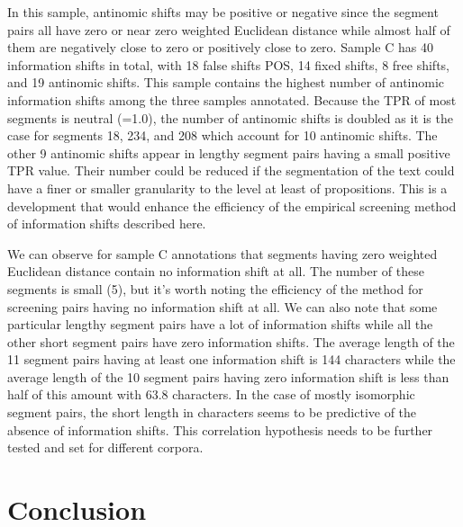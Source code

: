 \documentclass[output=paper]{langsci/langscibook}
\begin{document}
In this sample, antinomic shifts may be positive or negative since the segment pairs all have zero or near zero weighted Euclidean distance while almost half of them are negatively close to zero or positively close to zero. Sample C has 40 information shifts in total, with 18 false shifts POS, 14 fixed shifts, 8 free shifts, and 19 antinomic shifts. This sample contains the highest number of antinomic information shifts among the three samples annotated. Because the TPR of most segments is neutral (=1.0), the number of antinomic shifts is doubled as it is the case for segments 18, 234, and 208 which account for 10 antinomic shifts. The other 9 antinomic shifts appear in lengthy segment pairs having a small positive TPR value. Their number could be reduced if the segmentation of the text could have a finer or smaller granularity to the level at least of propositions. This is a development that would enhance the efficiency of the empirical screening method of information shifts described here. 

We can observe for sample C annotations that segments having zero weighted Euclidean distance contain no information shift at all. The number of these segments is small (5), but it’s worth noting the efficiency of the method for screening pairs having no information shift at all. We can also note that some particular lengthy segment pairs have a lot of information shifts while all the other short segment pairs have zero information shifts. The average length of the 11 segment pairs having at least one information shift is 144 characters while the average length of the 10 segment pairs having zero information shift is less than half of this amount with 63.8 characters. In the case of mostly isomorphic segment pairs, the short length in characters seems to be predictive of the absence of information shifts. This correlation hypothesis needs to be further tested and set for different corpora.

\section{Conclusion}\label{ep:conc}
\end{document}
